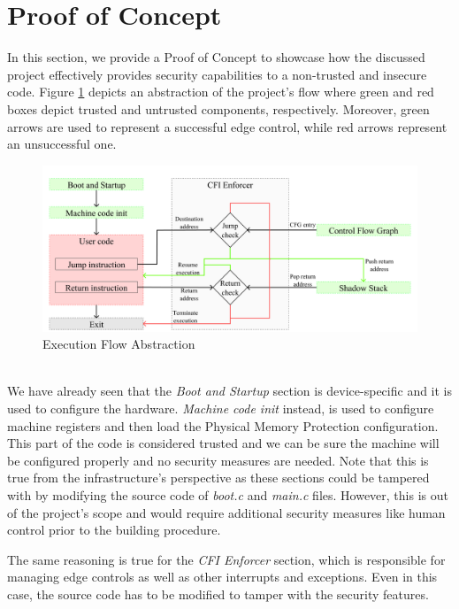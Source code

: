 \section{Proof of Concept}
\label{sec:project_poc}

In this section, we provide a Proof of Concept to showcase how the discussed project
effectively provides security capabilities to a non-trusted and insecure code.
Figure \ref{fig:functioning} depicts an abstraction of the project's flow where
green and red boxes depict trusted and untrusted components, respectively.
Moreover, green arrows are used to represent a successful edge control, while
red arrows represent an unsuccessful one. \\
\begin{figure}[htbp]
  \centering
  \includegraphics[width=.9\linewidth]{images/functioning.png}
  \caption{Execution Flow Abstraction}
  \label{fig:functioning}
\end{figure}
\\

We have already seen that the \textit{Boot and Startup} section is device-specific
and it is used to configure the hardware. \textit{Machine code init} instead, is
used to configure machine registers and then load the Physical Memory Protection
configuration. This part of the code is considered trusted and we can be sure the
machine will be configured properly and no security measures are needed. Note
that this is true from the infrastructure's perspective as these sections could
be tampered with by modifying the source code of \textit{boot.c} and \textit{main.c}
files. However, this is out of the project's scope and would require additional
security measures like human control prior to the building procedure.

The same reasoning is true for the \textit{CFI Enforcer} section, which is
responsible for managing edge controls as well as other interrupts and
exceptions. Even in this case, the source code has to be modified to tamper with
the security features.

